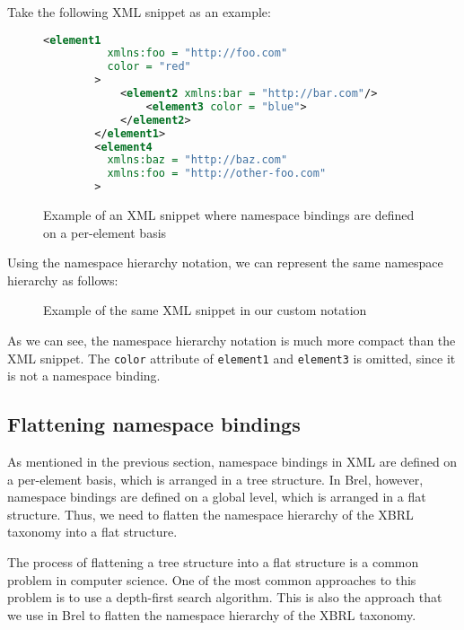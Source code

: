 Take the following XML snippet as an example:

\begin{figure}[H]
    \caption{Example of an XML snippet where namespace bindings are defined on a per-element basis}
    \label{fig:xml_namespace_notation_example}
    \begin{lstlisting}[language=XML]
        <element1 
          xmlns:foo = "http://foo.com" 
          color = "red"
        >
            <element2 xmlns:bar = "http://bar.com"/>
                <element3 color = "blue">
            </element2>
        </element1>
        <element4 
          xmlns:baz = "http://baz.com" 
          xmlns:foo = "http://other-foo.com"
        >
    \end{lstlisting}
\end{figure}

Using the namespace hierarchy notation, we can represent the same namespace hierarchy as follows:

\begin{figure}[H]
    \caption{Example of the same XML snippet in our custom notation}
    \label{fig:custom_namespace_notation_example}
\end{figure}

As we can see, the namespace hierarchy notation is much more compact than the XML snippet.
The \texttt{color} attribute of \texttt{element1} and \texttt{element3} is omitted, since it is not a namespace binding.

\subsection{Flattening namespace bindings}

As mentioned in the previous section, namespace bindings in XML are defined on a per-element basis,
which is arranged in a tree structure.
In Brel, however, namespace bindings are defined on a global level, which is arranged in a flat structure.
Thus, we need to flatten the namespace hierarchy of the XBRL taxonomy into a flat structure.

The process of flattening a tree structure into a flat structure is a common problem in computer science.
One of the most common approaches to this problem is to use a depth-first search algorithm.
This is also the approach that we use in Brel to flatten the namespace hierarchy of the XBRL taxonomy.


